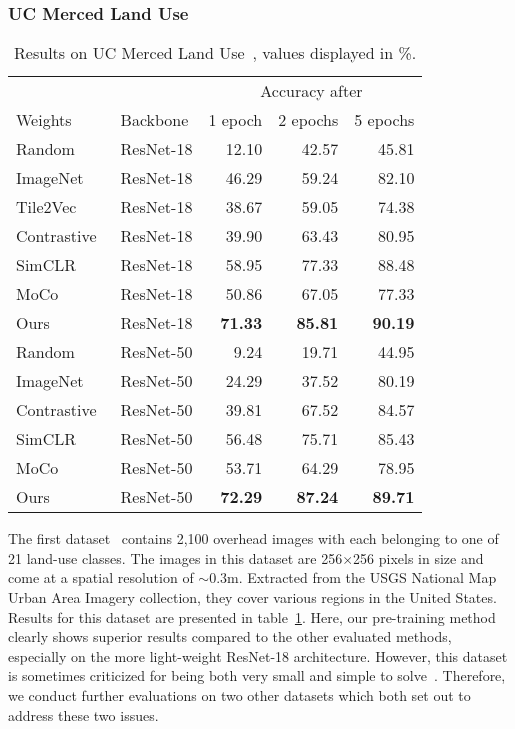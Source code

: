 \documentclass[journal]{IEEEtran}
\begin{document}
\subsubsection{UC Merced Land Use}
\begin{table}
  \center
  \caption{
    Results on UC Merced Land Use~\cite{ucmerced}, values displayed in \%.
  }\label{table:ucmerced}
  \begin{tabular}{llrrr}
    \toprule
    &&\multicolumn{3}{c}{Accuracy after}\\
    Weights&Backbone&1 epoch&2 epochs&5 epochs\\
    \midrule
    Random                        & ResNet-18 & 12.10 & 42.57 & 45.81 \\
    ImageNet                      & ResNet-18 & 46.29 & 59.24 & 82.10 \\
    Tile2Vec~\cite{tile2vec}      & ResNet-18 & 38.67 & 59.05 & 74.38 \\
    Contrastive~\cite{simclr}     & ResNet-18 & 39.90 & 63.43 & 80.95 \\
    SimCLR~\cite{simclr}          & ResNet-18 & 58.95 & 77.33 & 88.48 \\
    MoCo~\cite{he_momentum_2020}  & ResNet-18 & 50.86 & 67.05 & 77.33 \\
    Ours                          & ResNet-18 & \textbf{71.33} & \textbf{85.81} & \textbf{90.19} \\
    \midrule
    Random                        & ResNet-50 &  9.24 & 19.71 & 44.95 \\
    ImageNet                      & ResNet-50 & 24.29 & 37.52 & 80.19 \\
    Contrastive~\cite{simclr}     & ResNet-50 & 39.81 & 67.52 & 84.57 \\
    SimCLR~\cite{simclr}          & ResNet-50 & 56.48 & 75.71 & 85.43 \\
    MoCo~\cite{he_momentum_2020}  & ResNet-50 & 53.71 & 64.29 & 78.95 \\
    Ours                          & ResNet-50 & \textbf{72.29} & \textbf{87.24} & \textbf{89.71} \\
    \bottomrule
  \end{tabular}
  \vspace{6pt}
\end{table}
 The first dataset~\cite{ucmerced} contains 2,100 overhead images
with each belonging to one of 21 land-use classes.
The images in this dataset are 256$\times$256 pixels in size
and come at a spatial resolution of $\sim$0.3m.
Extracted from the USGS National Map Urban Area Imagery collection,
they cover various regions in the United States.
Results for this dataset are presented in table~\ref{table:ucmerced}.
Here, our pre-training method clearly shows superior results compared to the other evaluated methods,
especially on the more light-weight ResNet-18 architecture.
However, this dataset is sometimes criticized for
being both very small and simple to solve~\cite{resisc45,xia_aid_2017}.
Therefore, we conduct further evaluations on two other datasets
which both set out to address these two issues.
\end{document}
